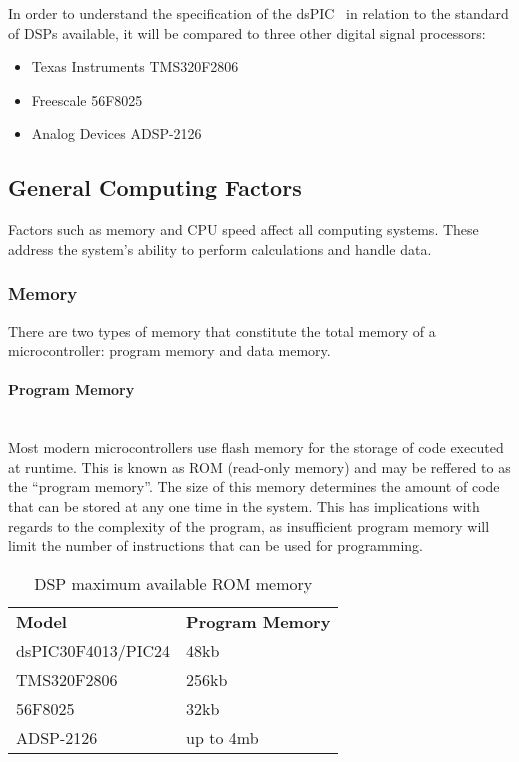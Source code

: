 \documentclass[titlepage]{scrartcl}
\begin{document}
    In order to understand the specification of the
    dsPIC~\parencite{mt2004dspic} in relation to the standard of DSPs
    available, it will be compared to three other digital signal processors:
    \begin{itemize}
        \item Texas Instruments TMS320F2806~\parencite{ti2016pm}
        \item Freescale 56F8025~\parencite{fs2006dsc}
        \item Analog Devices ADSP-2126~\parencite{ad2012adsp}
    \end{itemize}

    \subsection{General Computing Factors}
    Factors such as memory and CPU speed affect all computing systems. These
    address the system's ability to perform calculations and handle data.

    \subsubsection{Memory}
    There are two types of memory that constitute the total memory of a
    microcontroller: program memory and data memory.

    \paragraph{Program Memory}~\\
    Most modern microcontrollers use flash memory for the storage of code
    executed at runtime. This is known as ROM (read-only memory) and may be
    reffered to as the ``program memory''. The size of this memory determines
    the amount of code that can be stored at any one time in the system.
    This has implications with regards to the complexity of the program, as
    insufficient program memory will limit the number of instructions that can
    be used for programming.~\parencite[p.317]{raf2014fdlm}

    \begin{table}[H]
    \centering
    \caption{DSP maximum available ROM memory}
    \label{my-label}
    \begin{tabular}{ll}
        \textbf{Model}     & \textbf{Program Memory}\\
        dsPIC30F4013/PIC24 & 48kb      \\
        TMS320F2806        & 256kb     \\
        56F8025            & 32kb      \\
        ADSP-2126          & up to 4mb
    \end{tabular}
    \end{table}
\end{document}
